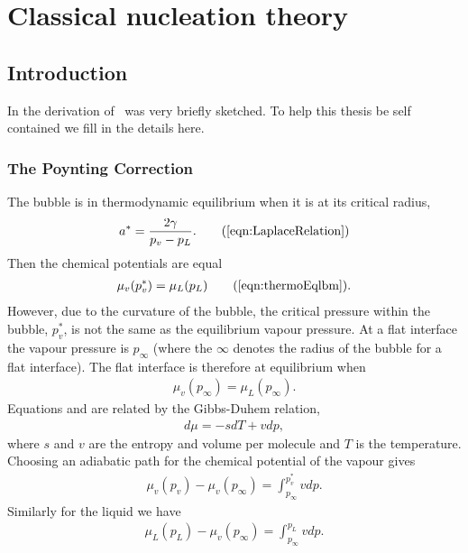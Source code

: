 \chapter{Classical nucleation theory}\label{app:CNT}

\section{Introduction}
In  the derivation of \cnt\ was very briefly sketched.
To help this thesis be self contained we fill in the details here.

\subsection{The Poynting Correction}
The bubble is in thermodynamic equilibrium when it is at its critical radius, 
\begin{align}
  \astar = \frac{2\gamma}{p_v-p_L}. \tag{\ref{eqn:LaplaceRelation}}
\end{align}
Then the chemical potentials are equal
\begin{align}
  \mu_v(p_v^\ast) = \mu_L(p_L)\tag{\ref{eqn:thermoEqlbm}}.
\end{align}
However, due to the curvature of the bubble, the critical pressure within the bubble, $p_v^\ast$,
is not the same as the equilibrium vapour pressure.
At a flat interface the vapour pressure is  $p_\infty$ (where the $\infty$ denotes the radius of the bubble for a flat interface).
The flat interface is therefore at equilibrium when
\begin{align}
  \mu_v(p_{\infty}) =  \mu_L(p_{\infty}). \label{eqn:thermoEqlbmInfity}
\end{align}
Equations  and   are related by the Gibbs-Duhem relation,
\begin{align}
  d \mu = -s dT + v dp,
\end{align}
 where $s$ and $v$ are the entropy and volume per molecule and $T$ is the temperature.
Choosing an adiabatic path for the chemical potential of the vapour gives
\begin{align}
\mu_v(p_v) - \mu_v(p_{\infty}) =  \int_{p_{\infty}}^{p_v^\ast} v dp. \label{eqn:GDvapour} %
\end{align}
Similarly for the liquid we have
\begin{align}
\mu_L(p_L) - \mu_v(p_{\infty}) =  \int_{p_{\infty}}^{p_L} v dp.\label{eqn:GDLiquid}  %
\end{align}
